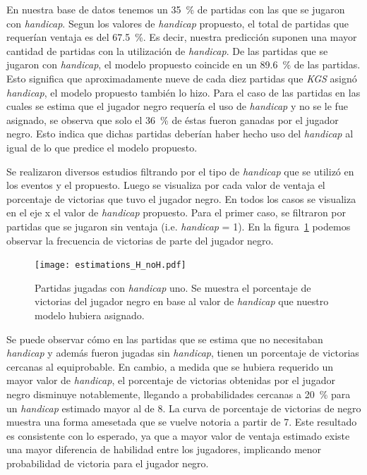 \documentclass[11pt,twoside,spanish]{report} %
\begin{document}
En nuestra base de datos tenemos un \SI{35}{\percent} de partidas con las que se jugaron con \textit{handicap}.
Segun los valores de \textit{handicap} propuesto, el total de partidas que requer\'ian ventaja es del \SI{67.5}{\percent}.
Es decir, nuestra predicci\'on suponen una mayor cantidad de partidas con la utilizaci\'on de \textit{handicap}.
De las partidas que se jugaron con \textit{handicap}, el modelo propuesto coincide en un \SI{89.6}{\percent} de las partidas.
Esto significa que aproximadamente nueve de cada diez partidas que \textit{KGS} asign\'o \textit{handicap}, el modelo propuesto tambi\'en lo hizo.
Para el caso de las partidas en las cuales se estima que el jugador negro  requer\'ia el uso de \textit{handicap} y no se le fue asignado, se observa que solo el \SI{36}{\percent} de \'estas fueron ganadas por el jugador negro.
Esto indica que dichas partidas deber\'ian haber hecho uso del \textit{handicap} al igual de lo que predice el modelo propuesto.


Se realizaron diversos estudios filtrando por el tipo de \textit{handicap} que se utiliz\'o en los eventos y el propuesto.
Luego se visualiza por cada valor de ventaja el porcentaje de victorias que tuvo el jugador negro.
En todos los casos se visualiza en el eje x el valor de \textit{handicap} propuesto.
Para el primer caso, se filtraron por partidas que se jugaron sin ventaja (i.e. \textit{handicap} = 1). 
En la figura~\ref{fig:handicap_porcentaje_no_asignado} podemos observar la frecuencia de victorias de parte del jugador negro.


\begin{figure}[H]
    \centering
    \texttt{[image: estimations\_H\_noH.pdf]}
    \caption{Partidas jugadas con \textit{handicap} uno. Se muestra el porcentaje de victorias del jugador negro en base al valor de \textit{handicap} que nuestro modelo hubiera asignado.}
    \label{fig:handicap_porcentaje_no_asignado}
\end{figure}

Se puede observar c\'omo en las partidas que se estima que no necesitaban \textit{handicap} y adem\'as fueron jugadas sin \textit{handicap}, tienen un porcentaje de victorias cercanas al equiprobable.
En cambio, a medida que se hubiera requerido un mayor valor de \textit{handicap}, el porcentaje de victorias obtenidas por el jugador negro disminuye notablemente, llegando a probabilidades cercanas a \SI{20}{\percent} para un \textit{handicap} estimado mayor al de 8.
La curva de porcentaje de victorias de negro muestra una forma amesetada que se vuelve notoria a partir de 7.
Este resultado es consistente con lo esperado, ya que a mayor valor de ventaja estimado existe una mayor diferencia de habilidad entre los jugadores, implicando menor probabilidad de victoria para el jugador negro.
\end{document}

